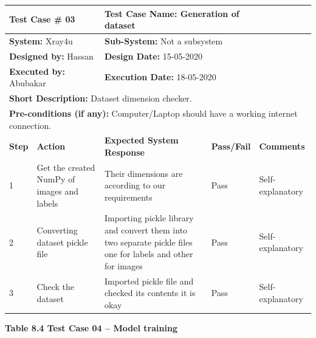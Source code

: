 \documentclass{article} %
\begin{document}
\begin{tabular}{|p{0.3in}|p{1.0in}|p{1.8in}|p{0.5in}|p{0.6in}|} \hline 
\multicolumn{2}{|p{1in}|}{\textbf{Test Case \#} 03} & \multicolumn{2}{|p{2.3in}|}{\textbf{Test Case Name}: Generation of dataset} &  \\ \hline 
\multicolumn{2}{|p{1in}|}{\textbf{System:} Xray4u} & \multicolumn{2}{|p{2.3in}|}{\textbf{Sub-System: }Not a subsystem\textbf{}} &  \\ \hline 
\multicolumn{2}{|p{1in}|}{\textbf{Designed by:} Hassan} & \multicolumn{2}{|p{2.3in}|}{\textbf{Design Date:} 15-05-2020} &  \\ \hline 
\multicolumn{2}{|p{1in}|}{\textbf{Executed by:} Abubakar} & \multicolumn{2}{|p{2.3in}|}{\textbf{Execution Date:} 18-05-2020} &  \\ \hline 
\multicolumn{5}{|p{1in}|}{\textbf{Short Description:} Dataset dimension checker.} \\ \hline 
\multicolumn{5}{|p{1in}|}{\textbf{Pre-conditions (if any):} Computer/Laptop should have a working internet connection.} \\ \hline 
\textbf{Step} & \textbf{Action} & \textbf{Expected System Response} & \textbf{Pass/Fail} & \textbf{Comments} \\ \hline 
1 & Get the created NumPy of images and labels & Their dimensions are according to our requirements & Pass & Self-explanatory \\ \hline 
2 & Converting dataset pickle file & Importing pickle library and convert them into two separate pickle files one for labels and other for images  & Pass & Self-explanatory \\ \hline 
3 & Check the dataset  & Imported pickle file and checked its contents it is okay & Pass & Self-explanatory \\ \hline 
\end{tabular}

\eject 

\noindent \textbf{Table 8.4 Test Case 04 -- Model training}
\end{document}

